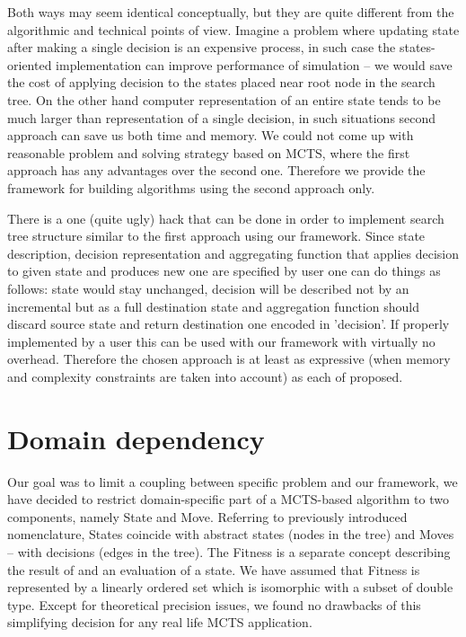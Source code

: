 Both ways may seem identical conceptually, but they are quite different from
the algorithmic and technical points of view.
Imagine a problem where updating state after making a single decision is an
expensive process, in such case the states-oriented implementation can improve
performance of simulation -- we would save the cost of applying decision to the
states placed near root node in the search tree.
On the other hand computer representation of an entire state tends to be much
larger than representation of a single decision, in such situations second
approach can save us both time and memory.
We could not come up with reasonable problem and solving strategy based on
MCTS, where the first approach has any advantages over the second one. Therefore we
provide the framework for building algorithms using the second approach only.

There is a one (quite ugly) hack that can be done in order to implement search
tree structure similar to the first approach using our framework. Since state
description, decision representation and aggregating function that applies
decision to given state and produces new one are specified by user one can do
things as follows: state would stay unchanged, decision will be described not
by an incremental but as a full destination state and aggregation function
should discard source state and return destination one encoded in 'decision'.
If properly implemented by a user this can be used with our framework with
virtually no overhead. Therefore the chosen approach is at least as expressive
(when memory and complexity constraints are taken into account) as each of
proposed.

\section{Domain dependency}
Our goal was to limit a coupling between specific problem and our framework, we
have decided to restrict domain-specific part of a MCTS-based algorithm to two
components, namely State and Move. Referring to previously introduced
nomenclature, States coincide with abstract states (nodes in the tree) and
Moves -- with decisions (edges in the tree).
The Fitness is a separate concept describing the result of and an evaluation of a
state. We have assumed that Fitness is represented by a linearly ordered set
which is isomorphic with a subset of double type. Except for theoretical
precision issues, we found no drawbacks of this simplifying decision for any
real life MCTS application.

